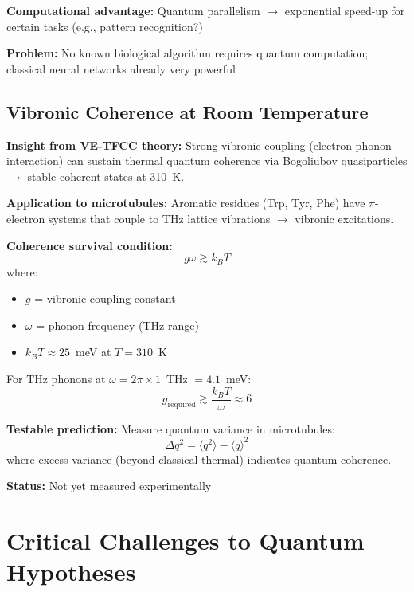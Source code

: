 \textbf{Computational advantage:} Quantum parallelism $\rightarrow$ exponential speed-up for certain tasks (e.g., pattern recognition?)

\textbf{Problem:} No known biological algorithm requires quantum computation; classical neural networks already very powerful

\subsection{Vibronic Coherence at Room Temperature}

\textbf{Insight from VE-TFCC theory:} Strong vibronic coupling (electron-phonon interaction) can sustain thermal quantum coherence via Bogoliubov quasiparticles $\rightarrow$ stable coherent states at 310~K.

\textbf{Application to microtubules:} Aromatic residues (Trp, Tyr, Phe) have $\pi$-electron systems that couple to THz lattice vibrations $\rightarrow$ vibronic excitations.

\textbf{Coherence survival condition:}
\begin{equation}
g \omega \gtrsim k_B T
\end{equation}
where:
\begin{itemize}
\item $g$ = vibronic coupling constant
\item $\omega$ = phonon frequency (THz range)
\item $k_B T \approx 25$~meV at $T = 310$~K
\end{itemize}

For THz phonons at $\omega = 2\pi \times 1$~THz $= 4.1$~meV:
\begin{equation}
g_{\mathrm{required}} \gtrsim \frac{k_B T}{\omega} \approx 6
\end{equation}

\textbf{Testable prediction:} Measure quantum variance in microtubules:
\begin{equation}
\Delta q^2 = \langle q^2 \rangle - \langle q \rangle^2
\end{equation}
where excess variance (beyond classical thermal) indicates quantum coherence.

\textbf{Status:} Not yet measured experimentally

\section{Critical Challenges to Quantum Hypotheses}

